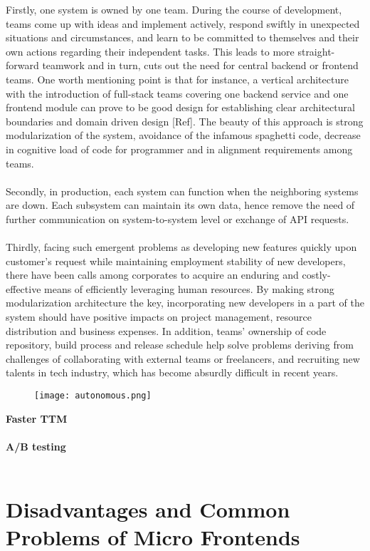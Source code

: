 \documentclass[a4paper]{book}
\begin{document}
Firstly, one system is owned by one team. During the course of development, teams come up with ideas and implement actively, respond swiftly in unexpected situations and circumstances, and learn to be committed to themselves and their own actions regarding their independent tasks. This leads to more straight-forward teamwork and in turn, cuts out the need for central backend or frontend teams. One worth mentioning point is that for instance, a vertical architecture with the introduction of full-stack teams covering one backend service and one frontend module can prove to be good design for establishing clear architectural boundaries and domain driven design [Ref]. The beauty of this approach is strong modularization of the system, avoidance of the infamous spaghetti code, decrease in cognitive load of code for programmer and in alignment requirements among teams.
\\ \\
Secondly, in production, each system can function when the neighboring systems are down. Each subsystem can maintain its own data, hence remove the need of further communication on system-to-system level or exchange of API requests.
\\ \\
Thirdly, facing such emergent problems as developing new features quickly upon customer’s request while maintaining employment stability of new developers, there have been calls among corporates to acquire an enduring and costly-effective means of efficiently leveraging human resources. By making strong modularization architecture the key, incorporating new developers in a part of the system should have positive impacts on project management, resource distribution and business expenses. In addition, teams’ ownership of code repository, build process and release schedule help solve problems deriving from challenges of collaborating with external teams or freelancers, and recruiting new talents in tech industry, which has become absurdly difficult in recent years.
\clearpage
\begin{figure}
    \centering
    \texttt{[image: autonomous.png]}
    \caption{\cite{Gee20}}
    \label{fig:my_label}
\end{figure}

\textbf{Faster TTM}
\\ \\
\textbf{A/B testing}
\\ \\
\section{Disadvantages and Common Problems of Micro Frontends}
\end{document}

